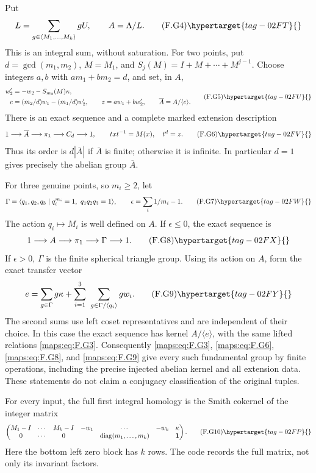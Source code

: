 \begin{theorem}
Put
\[
 L=\sum_{g\in\langle M_1,\ldots,M_k\rangle}gU,
 \qquad A=\Lambda/L.                                      \tag{F.G4}\hypertarget{tag-02FT}{}\label{maps:eq:F.G4}
\]
This is an integral sum, without saturation.  For two points, put
$d=\gcd(m_1,m_2)$, $M=M_1$, and
$S_j(M)=I+M+\cdots+M^{j-1}$.  Choose integers $a,b$ with
$am_1+bm_2=d$, and set, in $A$,
\[
 \begin{split}
 w'_2&=-w_2-S_{m_2}(M)\kappa,\\
 e&=(m_2/d)w_1-(m_1/d)w'_2,\qquad
 z=aw_1+bw'_2,\qquad \overline A=A/\langle e\rangle .
 \end{split}                                             \tag{F.G5}\hypertarget{tag-02FU}{}\label{maps:eq:F.G5}
\]
There is an exact sequence and a complete marked extension description
\[
 1\longrightarrow\overline A\longrightarrow\pi_1
   \longrightarrow C_d\longrightarrow1,
 \qquad txt^{-1}=M(x),\quad t^d=z.                         \tag{F.G6}\hypertarget{tag-02FV}{}\label{maps:eq:F.G6}
\]
Thus its order is $d|\overline A|$ if $\overline A$ is finite;
otherwise it is infinite.  In particular $d=1$ gives precisely
the abelian group $\overline A$.

For three genuine points, so $m_i\ge2$, let
\[
 \Gamma=\langle q_1,q_2,q_3\mid q_i^{m_i}=1,
                         \ q_1q_2q_3=1\rangle,
 \qquad \epsilon=\sum_i1/m_i-1.                           \tag{F.G7}\hypertarget{tag-02FW}{}\label{maps:eq:F.G7}
\]
The action $q_i\mapsto M_i$ is well defined on $A$.
If $\epsilon\le0$, the exact sequence is
\[
                    1\longrightarrow A\longrightarrow\pi_1
                         \longrightarrow\Gamma\longrightarrow1. 
 \tag{F.G8}\hypertarget{tag-02FX}{}\label{maps:eq:F.G8}
\]
If $\epsilon>0$, $\Gamma$ is the finite spherical triangle group.
Using its action on $A$, form the exact transfer vector
\[
 e=\sum_{g\in\Gamma}g\kappa+
       \sum_{i=1}^3\ \sum_{g\in\Gamma/\langle q_i\rangle}g w_i.
 \tag{F.G9}\hypertarget{tag-02FY}{}\label{maps:eq:F.G9}
\]
The second sums use left coset representatives and are independent
of their choice.  In this case the exact sequence has kernel
$A/\langle e\rangle$, with the same lifted relations \eqref{maps:eq:F.G3}.
Consequently \eqref{maps:eq:F.G3}, \eqref{maps:eq:F.G6}, \eqref{maps:eq:F.G8}, and \eqref{maps:eq:F.G9} give every such fundamental group by finite operations, including the precise
injected abelian kernel and all extension data.  These statements
do not claim a conjugacy classification of the original tuples.

For every input, the full first integral homology is the Smith
cokernel of the integer matrix
\[
 \begin{pmatrix}
 M_1-I&\cdots&M_k-I&-w_1&\cdots&-w_k&\kappa\\
 0&\cdots&0&&\operatorname{diag}(m_1,\ldots,m_k)&&\boldsymbol1
 \end{pmatrix}.                                           \tag{F.G10}\hypertarget{tag-02FP}{}\label{maps:eq:F.G10}
\]
Here the bottom left zero block has $k$ rows.  The code records
the full matrix, not only its invariant factors.

\end{theorem}


